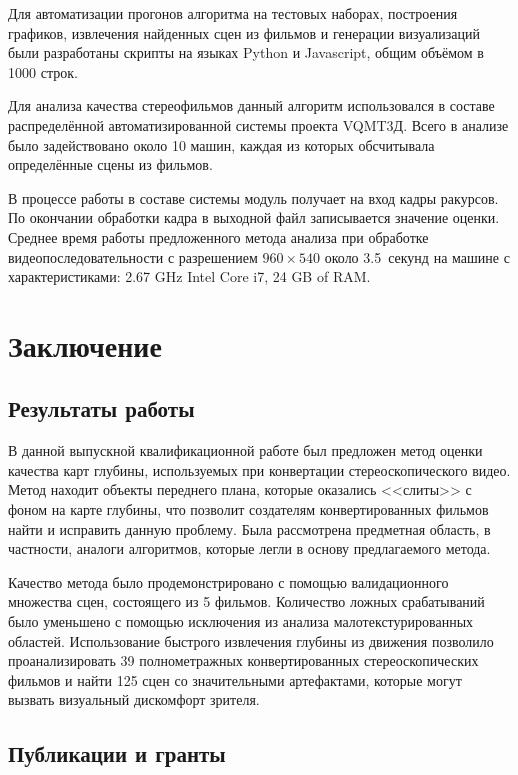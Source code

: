 \documentclass[14pt, a4paper]{extarticle}
\begin{document}
Для автоматизации прогонов алгоритма на тестовых наборах, построения графиков, 
извлечения найденных сцен из фильмов и генерации визуализаций были разработаны 
скрипты на языках Python и Javascript, общим объёмом в 1000 строк. 

Для анализа качества стереофильмов данный алгоритм использовался в составе 
распределённой автоматизированной системы проекта VQMT3Д. Всего в анализе было 
задействовано около 10 машин, каждая из которых обсчитывала определённые сцены из фильмов.

В процессе работы в составе системы модуль получает на вход кадры ракурсов. 
По окончании обработки кадра в выходной файл записывается значение оценки. 
Среднее время работы предложенного метода анализа при обработке 
видеопоследовательности с разрешением $960\times540$ около 3.5~секунд
на машине с характеристиками: 2.67 GHz Intel Core i7, 24 GB of RAM. 



\newpage
\section{Заключение}

\subsection{Результаты работы}

В данной выпускной квалификационной работе был 
предложен метод оценки качества карт глубины,
используемых при конвертации стереоскопического видео. Метод находит объекты
переднего плана, которые оказались <<слиты>> с фоном на карте глубины,
что позволит создателям конвертированных фильмов найти и исправить данную проблему.
Была рассмотрена предметная область, в частности, аналоги алгоритмов, которые легли
в основу предлагаемого метода.

Качество метода было продемонстрировано с помощью валидационного множества сцен, 
состоящего из 5 фильмов. Количество ложных срабатываний было уменьшено
с помощью исключения из анализа малотекстурированных областей. Использование
быстрого извлечения глубины из движения позволило проанализировать 39
полнометражных конвертированных стереоскопических фильмов и найти
125 сцен со значительными артефактами, которые могут вызвать визуальный
дискомфорт зрителя.

\subsection{Публикации и гранты}
\end{document}
